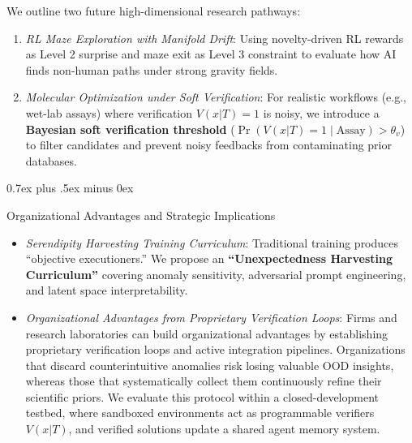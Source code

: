 \documentclass[10pt,journal,compsoc]{IEEEtran}
\makeatletter
\renewcommand{\subsection}{\@startsection{subsection}{2}{\z@}{-3.5ex plus -1.5ex minus -1.5ex}%
{0.7ex plus .5ex minus 0ex}{\normalfont\normalsize\sffamily\bfseries\raggedright}}
\makeatother
\begin{document}
We outline two future high-dimensional research pathways:
\begin{enumerate}
\item \textit{RL Maze Exploration with Manifold Drift}: Using novelty-driven RL rewards as Level 2 surprise and maze exit as Level 3 constraint to evaluate how AI finds non-human paths under strong gravity fields.
\item \textit{Molecular Optimization under Soft Verification}: For realistic workflows (e.g., wet-lab assays) where verification $V(x|T) = 1$ is noisy, we introduce a \textbf{Bayesian soft verification threshold} ($\Pr(V(x|T) = 1 \mid \text{Assay}) > \theta_v$) to filter candidates and prevent noisy feedbacks from contaminating prior databases.
\end{enumerate}

\subsection{Organizational Advantages and Strategic Implications}
\begin{itemize}
\item \textit{Serendipity Harvesting Training Curriculum}: Traditional training produces ``objective executioners.'' We propose an \textbf{``Unexpectedness Harvesting Curriculum''} covering anomaly sensitivity, adversarial prompt engineering, and latent space interpretability.
\item \textit{Organizational Advantages from Proprietary Verification Loops}: Firms and research laboratories can build organizational advantages by establishing proprietary verification loops and active integration pipelines. Organizations that discard counterintuitive anomalies risk losing valuable OOD insights, whereas those that systematically collect them continuously refine their scientific priors. We evaluate this protocol within a closed-development testbed, where sandboxed environments act as programmable verifiers $V(x|T)$, and verified solutions update a shared agent memory system.
\end{itemize}
\end{document}
